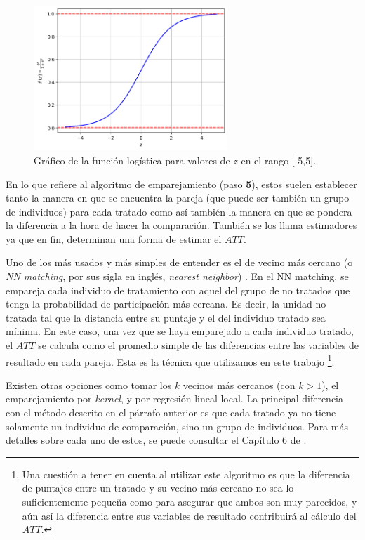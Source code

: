 \documentclass[../../main.tex]{subfiles}
\begin{document}
\begin{figure}[ht]
    \centering
    \includegraphics[width=0.65\textwidth]{figs/logit.png}
    \caption{Gráfico de la función logística para valores de \(z\) en el rango [-5,5].}
    \label{fig:logit}
\end{figure}

En lo que refiere al algoritmo de emparejamiento (paso \textbf{5}), estos suelen
establecer tanto la manera en que se encuentra la pareja (que puede ser también un grupo
de individuos) para cada tratado como así también la manera en que se pondera la
diferencia a la hora de hacer la comparación. También se los llama estimadores ya que en
fin, determinan una forma de estimar el \(ATT\).

Uno de los más usados y más simples de entender es el de vecino más cercano (o \textit{NN
matching}, por sus sigla en inglés, \textit{nearest neighbor}) \cite{bernal}. En el NN
matching, se empareja cada individuo de tratamiento con aquel del grupo de no tratados que
tenga la probabilidad de participación más cercana. Es decir, la unidad no tratada tal que
la distancia entre su puntaje y el del individuo tratado sea mínima. En este caso, una vez
que se haya emparejado a cada individuo tratado, el \(ATT\) se calcula como el promedio
simple de las diferencias entre las variables de resultado en cada pareja. Esta es la
técnica que utilizamos en este trabajo \footnote{Una cuestión a tener en cuenta al
utilizar este algoritmo es que la diferencia de puntajes entre un tratado y su vecino más
cercano no sea lo suficientemente pequeña como para asegurar que ambos son muy parecidos,
y aún así la diferencia entre sus variables de resultado contribuirá al cálculo del
\(ATT\).}.

Existen otras opciones como tomar los \(k\) vecinos más cercanos (con \(k > 1\)), el
emparejamiento por \textit{kernel}, y por regresión lineal local. La principal diferencia
con el método descrito en el párrafo anterior es que cada tratado ya no tiene solamente un
individuo de comparación, sino un grupo de individuos. Para más detalles sobre cada uno de
estos, se puede consultar el Capítulo 6 de \cite{bernal}.
\end{document}
